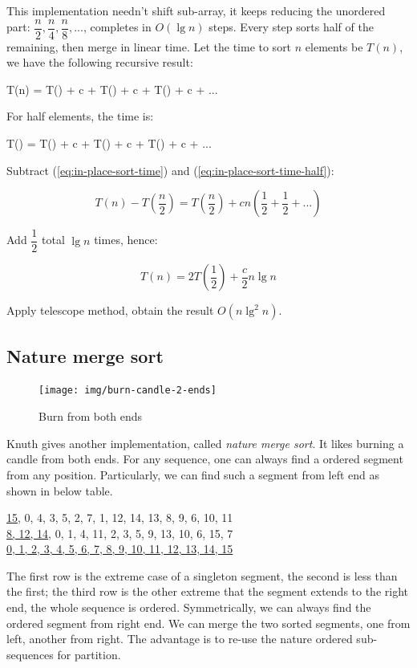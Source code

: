\documentclass[b5paper]{article}
\begin{document}
This implementation needn't shift sub-array, it keeps reducing the unordered part: $\dfrac{n}{2}, \dfrac{n}{4}, \dfrac{n}{8}, ...$, completes in $O(\lg n)$ steps. Every step sorts half of the remaining, then merge in linear time. Let the time to sort $n$ elements be $T(n)$, we have the following recursive result:

\be
T(n) = T() + c  + T() + c  + T() + c  + ...
\label{eq:in-place-sort-time}
\ee

For half elements, the time is:

\be
T() = T() + c  + T() + c  + T() + c  + ...
\label{eq:in-place-sort-time-half}
\ee

Subtract (\ref{eq:in-place-sort-time}) and (\ref{eq:in-place-sort-time-half}):

\[
T(n) - T(\frac{n}{2}) = T(\frac{n}{2}) + c n (\frac{1}{2} + \frac{1}{2} + ... )
\]

Add $\dfrac{1}{2}$ total $\lg n$ times, hence:

\[
T(n) = 2 T(\frac{1}{2}) + \frac{c}{2} n \lg n
\]

Apply telescope method, obtain the result $O(n \lg^2 n)$.

\subsection{Nature merge sort}

\begin{figure}[htbp]
 \centering
 \texttt{[image: img/burn-candle-2-ends]}
 \caption{Burn from both ends}
 \label{fig:burn-candle}
\end{figure}

Knuth gives another implementation, called {\em nature merge sort}. It likes burning a candle from both ends\cite{TAOCP}. For any sequence, one can always find a ordered segment from any position. Particularly, we can find such a segment from left end as shown in below table.

\underline{15}, 0, 4, 3, 5, 2, 7, 1, 12, 14, 13, 8, 9, 6, 10, 11 \\
\underline{8, 12, 14}, 0, 1, 4, 11, 2, 3, 5, 9, 13, 10, 6, 15, 7 \\
\underline{0, 1, 2, 3, 4, 5, 6, 7, 8, 9, 10, 11, 12, 13, 14, 15 } \\
\etab

The first row is the extreme case of a singleton segment, the second is less than the first; the third row is the other extreme that the segment extends to the right end, the whole sequence is ordered. Symmetrically, we can always find the ordered segment from right end. We can merge the two sorted segments, one from left, another from right. The advantage is to re-use the nature ordered sub-sequences for partition.
\end{document}
